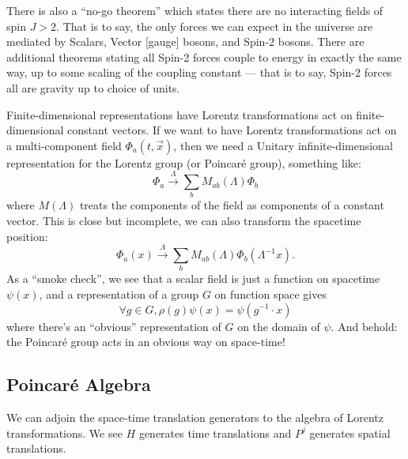 \begin{ddanger}%
There is also a ``no-go theorem'' which states there are no interacting
fields of spin $J>2$. That is to say, the only forces we can expect in
the universe are mediated by Scalars, Vector [gauge] bosons, and Spin-2
bosons. There are additional theorems stating all Spin-2 forces couple
to energy in exactly the same way, up to some scaling of the coupling
constant --- that is to say, Spin-2 forces all are gravity up to choice
of units.
\end{ddanger}

Finite-dimensional representations have Lorentz transformations act on
finite-dimensional constant vectors. If we want to have Lorentz
transformations act on a multi-component field $\Phi_{a}(t,\vec{x})$,
then we need a Unitary infinite-dimensional representation for the
Lorentz group (or Poincar\'e group), something like:
\begin{equation}
\Phi_{a}\xrightarrow{\Lambda}\sum_{b}M_{ab}(\Lambda)\Phi_{b}
\end{equation}
where $M(\Lambda)$ treats the components of the field as components of a
constant vector. This is close but incomplete, we can also transform the
spacetime position:
\begin{equation}
\Phi_{a}(x)\xrightarrow{\Lambda}\sum_{b}M_{ab}(\Lambda)\Phi_{b}(\Lambda^{-1}x).
\end{equation}
As a ``smoke check'', we see that a scalar field is just a function on
spacetime $\psi(x)$, and a representation of a group $G$ on function space
gives
\begin{equation}
\forall g\in G, \rho(g)\psi(x)=\psi(g^{-1}\cdot x)
\end{equation}
where there's an ``obvious'' representation of $G$ on the domain of $\psi$.
And behold: the Poincar\'e group acts in an obvious way on space-time!


\subsection{Poincar\'e Algebra}

\M We can adjoin the space-time translation generators to the algebra of
Lorentz transformations. We see $H$ generates time translations and
$P^{j}$ generates spatial translations.

